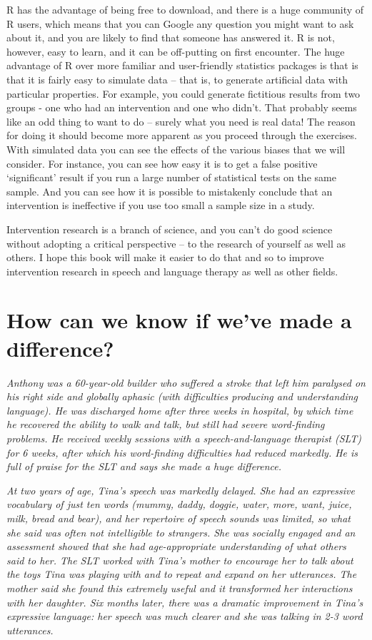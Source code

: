 \documentclass[]{book}
\begin{document}
R has the advantage of being free to download, and there is a huge community of R users, which means that you can Google any question you might want to ask about it, and you are likely to find that someone has answered it. R is not, however, easy to learn, and it can be off-putting on first encounter. The huge advantage of R over more familiar and user-friendly statistics packages is that is that it is fairly easy to simulate data -- that is, to generate artificial data with particular properties. For example, you could generate fictitious results from two groups - one who had an intervention and one who didn't. That probably seems like an odd thing to want to do -- surely what you need is real data! The reason for doing it should become more apparent as you proceed through the exercises. With simulated data you can see the effects of the various biases that we will consider. For instance, you can see how easy it is to get a false positive `significant' result if you run a large number of statistical tests on the same sample. And you can see how it is possible to mistakenly conclude that an intervention is ineffective if you use too small a sample size in a study.

Intervention research is a branch of science, and you can't do good science without adopting a critical perspective -- to the research of yourself as well as others. I hope this book will make it easier to do that and so to improve intervention research in speech and language therapy as well as other fields.

\hypertarget{how-can-we-know-if-weve-made-a-difference}{%
\chapter{How can we know if we've made a difference?}\label{how-can-we-know-if-weve-made-a-difference}}

\emph{Anthony was a 60-year-old builder who suffered a stroke that left him paralysed on his right side and globally aphasic (with difficulties producing and understanding language). He was discharged home after three weeks in hospital, by which time he recovered the ability to walk and talk, but still had severe word-finding problems. He received weekly sessions with a speech-and-language therapist (SLT) for 6 weeks, after which his word-finding difficulties had reduced markedly. He is full of praise for the SLT and says she made a huge difference.}

\emph{At two years of age, Tina's speech was markedly delayed. She had an expressive vocabulary of just ten words (mummy, daddy, doggie, water, more, want, juice, milk, bread and bear), and her repertoire of speech sounds was limited, so what she said was often not intelligible to strangers. She was socially engaged and an assessment showed that she had age-appropriate understanding of what others said to her. The SLT worked with Tina's mother to encourage her to talk about the toys Tina was playing with and to repeat and expand on her utterances. The mother said she found this extremely useful and it transformed her interactions with her daughter. Six months later, there was a dramatic improvement in Tina's expressive language: her speech was much clearer and she was talking in 2-3 word utterances.}
\end{document}

